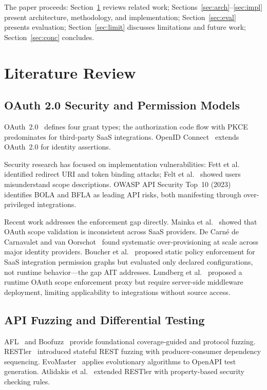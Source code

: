\documentclass[conference]{IEEEtran}
\begin{document}
The paper proceeds: Section~\ref{sec:lit} reviews related work;
Sections~\ref{sec:arch}--\ref{sec:impl} present architecture,
methodology, and implementation; Section~\ref{sec:eval} presents
evaluation; Section~\ref{sec:limit} discusses limitations and future
work; Section~\ref{sec:conc} concludes.

\section{Literature Review}
\label{sec:lit}

\subsection{OAuth 2.0 Security and Permission Models}

OAuth~2.0~\cite{rfc6749} defines four grant types; the authorization
code flow with PKCE~\cite{rfc7636} predominates for third-party SaaS
integrations. OpenID Connect~\cite{oidc} extends OAuth~2.0 for
identity assertions.

Security research has focused on implementation vulnerabilities: Fett
et al.~\cite{fett2017} identified redirect URI and token binding
attacks; Felt et al.~\cite{felt2012} showed users misunderstand scope
descriptions. OWASP API Security Top~10 (2023)~\cite{owasp2023}
identifies BOLA and BFLA as leading API risks, both manifesting
through over-privileged integrations.

Recent work addresses the enforcement gap directly. Mainka et
al.~\cite{mainka2022} showed that OAuth scope validation is
inconsistent across SaaS providers. De Carné de Carnavalet and van
Oorschot~\cite{decarne2023} found systematic over-provisioning at
scale across major identity providers. Boucher et al.~\cite{boucher2024}
proposed static policy enforcement for SaaS integration permission
graphs but evaluated only declared configurations, not runtime
behavior---the gap AIT addresses. Lundberg et al.~\cite{lundberg2024}
proposed a runtime OAuth scope enforcement proxy but require server-side
middleware deployment, limiting applicability to integrations without
source access.

\subsection{API Fuzzing and Differential Testing}

AFL~\cite{afl} and Boofuzz~\cite{boofuzz} provide foundational
coverage-guided and protocol fuzzing. RESTler~\cite{restler} introduced
stateful REST fuzzing with producer-consumer dependency sequencing.
EvoMaster~\cite{evomaster} applies evolutionary algorithms to OpenAPI
test generation. Atlidakis et al.~\cite{atlidakis2022} extended
RESTler with property-based security checking rules.
\end{document}
